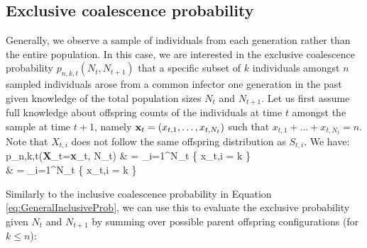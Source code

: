 \documentclass{article}
\let\oldalign\align
\let\oldendalign\endalign
\renewenvironment{align}{\linenomathNonumbers\oldalign}{\oldendalign\endlinenomath}
\renewcommand{\eqref}[1]{\ref{#1}}
\begin{document}
\subsection{Exclusive coalescence probability}

Generally, we observe a sample of individuals from each generation rather than the entire population.
In this case, we are interested in the exclusive coalescence probability $p_{n,k,t}(N_t, N_{t+1})$ that a specific subset of $k$ individuals amongst $n$ sampled individuals arose from a common infector one generation in the past given knowledge of the total population sizes $N_t$ and $N_{t+1}$.
%
Let us first assume full knowledge about offspring counts of the individuals at time $t$ amongst the sample at time $t+1$, namely ${\bf x}_t = (x_{t,1}, \dots, x_{t,N_t})$ such that $x_{t,1}+...+x_{t,N_t}=n$. 
Note that $X_{t,i}$ does not follow the same offspring distribution as $S_{t,i}$. We have:
	\begin{align}
		p_{n,k,t}({\bf X}_t={\bf x}_t, N_t)
			& = \sum_{i=1}^{N_t}   \{ x_{t,i} = k \}\nonumber\\
			& = \sum_{i=1}^{N_t}    \{ x_{t,i} = k \}
	\end{align}

Similarly to the inclusive coalescence probability in Equation \eqref{eq:GeneralInclusiveProb}, we can use this to evaluate the exclusive probability given $N_t$ and $N_{t+1}$ by summing over possible parent offspring configurations (for $k \leq n$):
\end{document}
